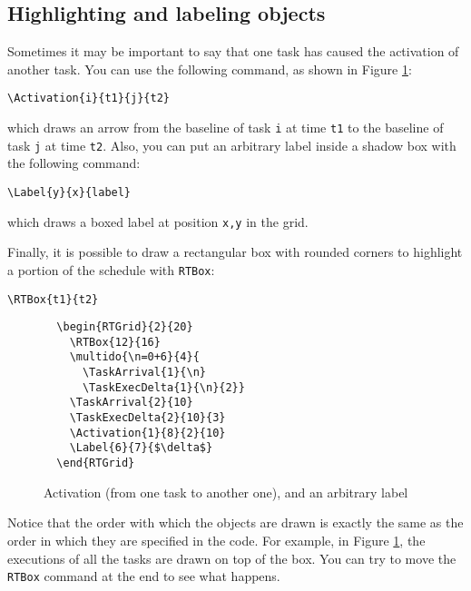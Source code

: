 \documentclass{article}
\begin{document}
\subsection{Highlighting and labeling objects}

Sometimes it may be important to say that one task has caused the
activation of another task. You can use the following command, as
shown in Figure \ref{fig:ex3a}:
\begin{verbatim}
\Activation{i}{t1}{j}{t2}
\end{verbatim}
which draws an arrow from the baseline of task \texttt{i} at time
\texttt{t1} to the baseline of task \texttt{j} at time \texttt{t2}.
Also, you can put an arbitrary label inside a shadow box with the
following command:
\begin{verbatim}
\Label{y}{x}{label}
\end{verbatim}
which draws a boxed label at position \texttt{x,y} in the grid.

Finally, it is possible to draw a rectangular box with rounded corners
to highlight a portion of the schedule with \texttt{RTBox}:
\begin{verbatim}
\RTBox{t1}{t2}
\end{verbatim}

\begin{figure}[h]
  \centering
  \begin{RTGrid}{2}{20}
  \end{RTGrid}
\begin{verbatim}
  \begin{RTGrid}{2}{20}
    \RTBox{12}{16}
    \multido{\n=0+6}{4}{
      \TaskArrival{1}{\n}
      \TaskExecDelta{1}{\n}{2}}
    \TaskArrival{2}{10}
    \TaskExecDelta{2}{10}{3}
    \Activation{1}{8}{2}{10}
    \Label{6}{7}{$\delta$}
  \end{RTGrid}
\end{verbatim}
  \caption{Activation (from one task to another one), and an arbitrary label}
  \label{fig:ex3a}
\end{figure}

Notice that the order with which the objects are drawn is exactly the
same as the order in which they are specified in the code. For
example, in Figure \ref{fig:ex3a}, the executions of all the tasks are
drawn on top of the box. You can try to move the \texttt{RTBox}
command at the end to see what happens.
\end{document}
